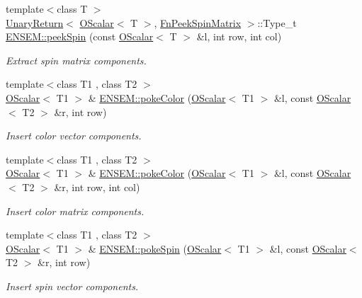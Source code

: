 \begin{DoxyCompactItemize}
\item 
{\footnotesize template$<$class T $>$ }\\\mbox{\hyperlink{structENSEM_1_1UnaryReturn}{Unary\+Return}}$<$ \mbox{\hyperlink{classENSEM_1_1OScalar}{O\+Scalar}}$<$ T $>$, \mbox{\hyperlink{structENSEM_1_1FnPeekSpinMatrix}{Fn\+Peek\+Spin\+Matrix}} $>$\+::Type\+\_\+t \mbox{\hyperlink{group__obsscalar_ga9ce0c024aa13d3c00740b9a82d2912db}{E\+N\+S\+E\+M\+::peek\+Spin}} (const \mbox{\hyperlink{classENSEM_1_1OScalar}{O\+Scalar}}$<$ T $>$ \&l, int row, int col)
\begin{DoxyCompactList}\small\item\em Extract spin matrix components. \end{DoxyCompactList}\item 
{\footnotesize template$<$class T1 , class T2 $>$ }\\\mbox{\hyperlink{classENSEM_1_1OScalar}{O\+Scalar}}$<$ T1 $>$ \& \mbox{\hyperlink{group__obsscalar_ga0a369092bcae6deacc6b6a1a5177ddb1}{E\+N\+S\+E\+M\+::poke\+Color}} (\mbox{\hyperlink{classENSEM_1_1OScalar}{O\+Scalar}}$<$ T1 $>$ \&l, const \mbox{\hyperlink{classENSEM_1_1OScalar}{O\+Scalar}}$<$ T2 $>$ \&r, int row)
\begin{DoxyCompactList}\small\item\em Insert color vector components. \end{DoxyCompactList}\item 
{\footnotesize template$<$class T1 , class T2 $>$ }\\\mbox{\hyperlink{classENSEM_1_1OScalar}{O\+Scalar}}$<$ T1 $>$ \& \mbox{\hyperlink{group__obsscalar_ga9271cf018f5c0e5f74f6b065b68f91b9}{E\+N\+S\+E\+M\+::poke\+Color}} (\mbox{\hyperlink{classENSEM_1_1OScalar}{O\+Scalar}}$<$ T1 $>$ \&l, const \mbox{\hyperlink{classENSEM_1_1OScalar}{O\+Scalar}}$<$ T2 $>$ \&r, int row, int col)
\begin{DoxyCompactList}\small\item\em Insert color matrix components. \end{DoxyCompactList}\item 
{\footnotesize template$<$class T1 , class T2 $>$ }\\\mbox{\hyperlink{classENSEM_1_1OScalar}{O\+Scalar}}$<$ T1 $>$ \& \mbox{\hyperlink{group__obsscalar_ga4ad5af637811a273152545d97b009c62}{E\+N\+S\+E\+M\+::poke\+Spin}} (\mbox{\hyperlink{classENSEM_1_1OScalar}{O\+Scalar}}$<$ T1 $>$ \&l, const \mbox{\hyperlink{classENSEM_1_1OScalar}{O\+Scalar}}$<$ T2 $>$ \&r, int row)
\begin{DoxyCompactList}\small\item\em Insert spin vector components. \end{DoxyCompactList}\item 

\end{DoxyCompactItemize}
